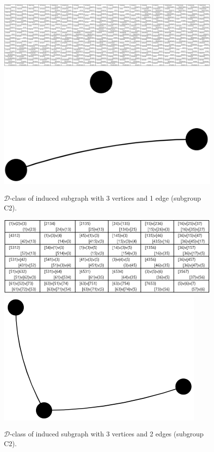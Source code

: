 \begin{appendices}
\begin{figure}[H]
\includegraphics[width=\textwidth,keepaspectratio]{images/x9/x9_3v_1e.png}
\includegraphics[scale=0.1]{images/x1/x1_3v_1e_vis.png}
\caption{$\mathcal{D}$-class of induced subgraph with 3 vertices and 1 edge (subgroup C2).}
\end{figure}

\begin{figure}[H]
\includegraphics[scale=0.15]{images/x9/x9_3v_2e.png}
\includegraphics[scale=0.1]{images/x1/x1_3v_2e_vis.png}
\caption{$\mathcal{D}$-class of induced subgraph with 3 vertices and 2 edges (subgroup C2).}
\end{figure}


\end{appendices}
